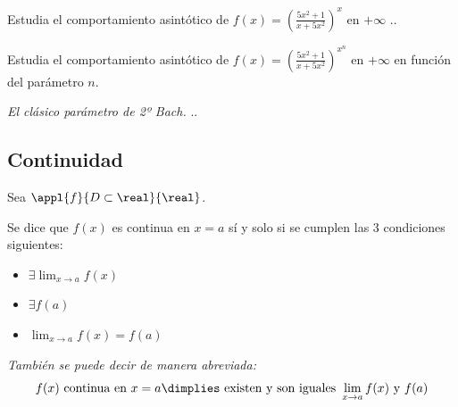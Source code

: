\begin{problem}
Estudia el comportamiento asintótico de $f(x) = \left(\frac{5x^2+1}{x+5x^2}\right)^{x} $ en $+\infty$
\solution
.\vspace{8cm}.
\end{problem}

\begin{problem}
Estudia el comportamiento asintótico de $f(x) = \left(\frac{5x^2+1}{x+5x^2}\right)^{x^n} $ en $+\infty$ en función del parámetro $n$.

\textit{El clásico parámetro de 2º Bach.}
\solution
.\vspace{8cm}.
\end{problem}


\subsection{Continuidad}

\begin{defn}
Sea $\appl{f}{D\subset\real}{\real}$.

Se dice que $f(x)$ es continua en $x=a$ sí y solo si se cumplen las 3 condiciones siguientes:
\begin{itemize}
	\item $\exists \displaystyle\lim_{x\to a} f(x)$
	\item $\exists f(a)$
	\item $\displaystyle\lim_{x\to a}f(x) = f(a)$
\end{itemize}

\textit{También se puede decir de manera abreviada: \[f(x) \text{ continua en } x=a\dimplies \text{ existen y son iguales } \lim_{x\to a}f(x) \text{ y } f(a)\]}
\end{defn}

